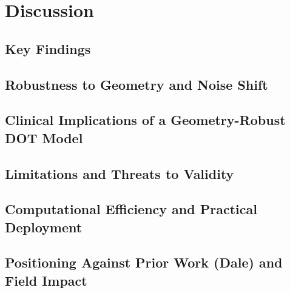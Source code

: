 \chapter{Discussion}
\section{Key Findings}
\section{Robustness to Geometry and Noise Shift}
\section{Clinical Implications of a Geometry-Robust DOT Model}
\section{Limitations and Threats to Validity}
\section{Computational Efficiency and Practical Deployment}
\section{Positioning Against Prior Work (Dale) and Field Impact}